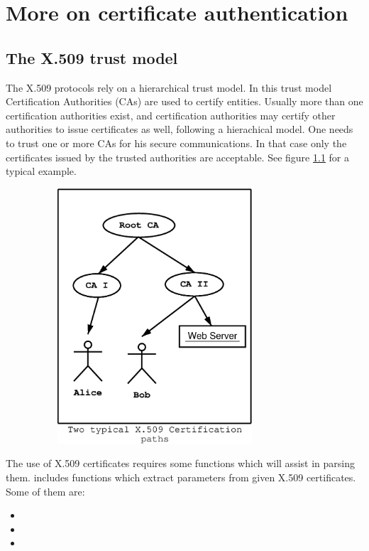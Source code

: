 \chapter{More on certificate authentication}

\section{The X.509 trust model}
\label{x509:trust}

The X.509 protocols rely on a hierarchical trust model. In this trust model
Certification Authorities (CAs) are used to certify entities.
Usually more than one certification authorities exist, and certification
authorities may certify other authorities to issue certificates as well,
following a hierachical model. 
One needs to trust one or more CAs for his secure
communications. In that case only the certificates issued by the trusted
authorities are acceptable. See figure \ref{fig:x509-1} for a typical example.

\begin{figure}[hbtp]
\includegraphics[height=9.5cm,width=9cm]{x509-1}
\label{fig:x509-1}
\end{figure}

\par The use of X.509 certificates requires some functions which will 
assist in parsing them. \gnutls{} includes functions which extract 
parameters from given X.509 certificates. Some of them are:
\begin{itemize}
\item {}
\item {}
\item {}
\end{itemize}

